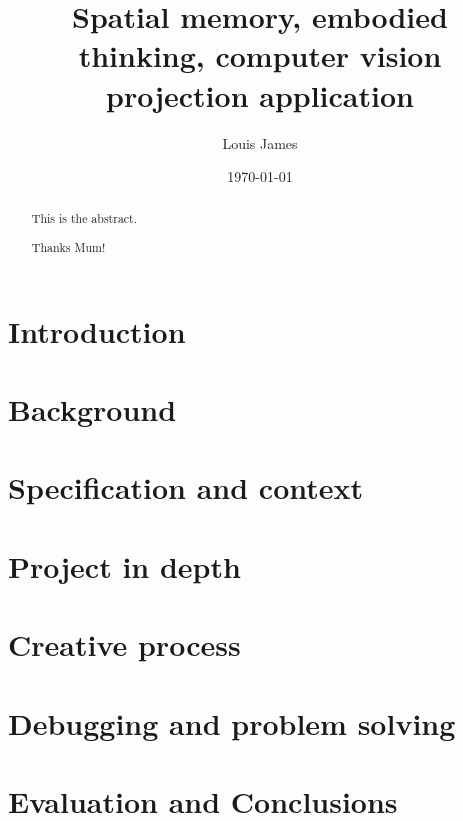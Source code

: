 \documentclass[11pt]{report}
\author{Louis James}
\date{\today}
\title{Spatial memory, embodied thinking, computer vision projection application}
\begin{document}
\maketitle

\begin{abstract}
This is the abstract.
\end{abstract}

\renewcommand{\abstractname}{Acknowledgements}
\begin{abstract}
 Thanks Mum!
\end{abstract}

\tableofcontents

\chapter{Introduction}
\label{sec:org2f9ca89}

\chapter{Background}
\label{sec:org300d1c4}

\chapter{Specification and context}
\label{sec:orgcf59875}

\chapter{Project in depth}
\label{sec:org6269791}

\chapter{Creative process}
\label{sec:orgacdb8f3}

\chapter{Debugging and problem solving}
\label{sec:org36f51b7}

\chapter{Evaluation and Conclusions}
\label{sec:org5da18e8}



\end{document}
